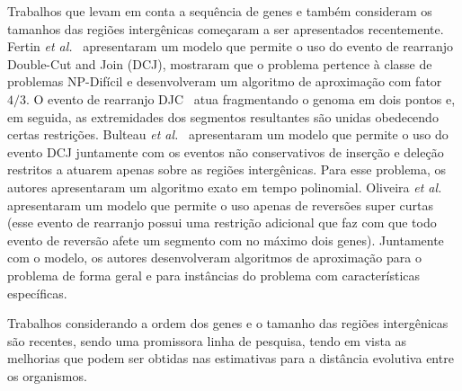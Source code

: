 Trabalhos que levam em conta a sequência de genes e também consideram os tamanhos das regiões intergênicas começaram a ser apresentados recentemente. Fertin \textit{et al.}~\cite{2017-fertin-etal} apresentaram um modelo que permite o uso do evento de rearranjo Double-Cut and Join (DCJ), mostraram que o problema pertence à classe de problemas NP-Difícil e desenvolveram um algoritmo de aproximação com fator $4/3$. O evento de rearranjo DJC~\cite{2005-yancopoulos-etal} atua fragmentando o genoma em dois pontos e, em seguida, as extremidades dos segmentos resultantes são unidas obedecendo certas restrições. Bulteau \textit{et al.}~\cite{2016b-bulteau-etal} apresentaram um modelo que permite o uso do evento DCJ juntamente com os eventos não conservativos de inserção e deleção restritos a atuarem apenas sobre as regiões intergênicas. Para esse problema, os autores apresentaram um algoritmo exato em tempo polinomial. Oliveira \textit{et al.}~\cite{2018b-oliveira-etal} apresentaram um modelo que permite o uso apenas de reversões super curtas (esse evento de rearranjo possui uma restrição adicional que faz com que todo evento de reversão afete um segmento com no máximo dois genes). Juntamente com o modelo, os autores desenvolveram algoritmos de aproximação para o problema de forma geral e para instâncias do problema com características específicas.

Trabalhos considerando a ordem dos genes e o tamanho das regiões intergênicas são recentes, sendo uma promissora linha de pesquisa, tendo em vista as melhorias que podem ser obtidas nas estimativas para a distância evolutiva entre os organismos.

